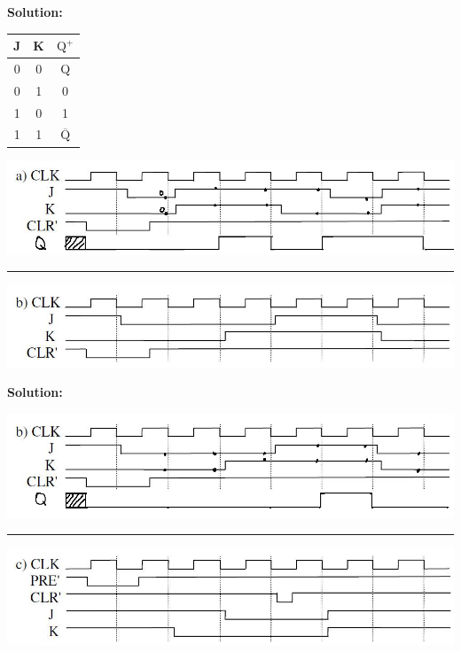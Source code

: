 \documentclass{article}
\begin{document}
    \textbf{Solution:}

    \begin{center}
        \begin{tabular} {cc|c}
            J & K & $\text{Q}^+$ \\
            \hline
            0 & 0 & Q \\
            0 & 1 & 0 \\
            1 & 0 & 1 \\
            1 & 1 & $\overline{\text{Q}}$ \\
        \end{tabular}
    \end{center}

    \begin{center}
        \includegraphics[width=\linewidth]{HW4_q9.2.1.png}
    \end{center}

    \noindent\rule{\textwidth}{0.8pt}

    \begin{center}
        \includegraphics[width=\linewidth]{HW4_q9.3.png}
    \end{center}

    \textbf{Solution:}

    \begin{center}
        \includegraphics[width=\linewidth]{HW4_q9.3.1.png}
    \end{center}

    \noindent\rule{\textwidth}{0.8pt}

    \begin{center}
        \includegraphics[width=\linewidth]{HW4_q9.4.png}
    \end{center}
\end{document}
